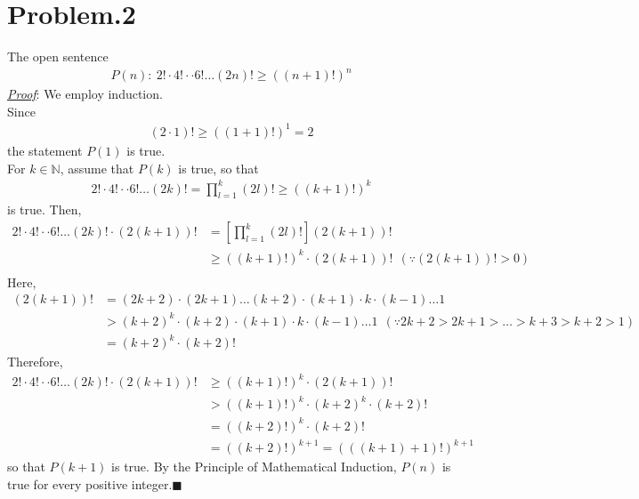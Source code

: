 \documentclass[12pt]{article}
\begin{document}
\section*{Problem.2}
The open sentence
\begin{gather*}
P(n):~ 2! \cdot 4! \cdot \cdot 6! \dots (2n)! \geq ((n+1)!)^n
\end{gather*}
\underline{\textit{Proof}}: We employ induction.\\[1em]
Since
\begin{gather*}
(2\cdot1)! \geq ((1+1)!)^1 = 2
\end{gather*}
the statement $P(1)$ is true.\\
For $k \in \mathbb{N}$, assume that $P(k)$ is true, so that
\begin{gather*}
2! \cdot 4! \cdot \cdot 6! \dots (2k)! = \prod_{l=1}^{k} (2l)! \geq ((k+1)!)^k
\end{gather*}
is true. Then,
\begin{align*}
2! \cdot 4! \cdot \cdot 6! \dots (2k)! \cdot (2(k+1))! &= \left[\prod_{l=1}^{k} (2l)! \right] (2(k+1))!\\[1em]
&\geq ((k+1)!)^k \cdot (2(k+1))! ~~\left(\because (2(k+1))! > 0\right)\\[1em]
\end{align*}
Here,
\begin{align*}
(2(k+1))! &= (2k+2) \cdot (2k+1) \dots (k+2) \cdot (k+1) \cdot k \cdot (k-1) \dots 1\\[1em]
& > (k + 2)^{k} \cdot (k + 2) \cdot (k+1) \cdot k \cdot (k-1) \dots 1 ~~\left(\because 2k + 2 > 2k + 1 > \dots > k + 3 > k + 2 > 1\right)\\[1em]
&= (k + 2)^{k} \cdot (k+2)!
\end{align*}
Therefore,
\begin{align*}
2! \cdot 4! \cdot \cdot 6! \dots (2k)! \cdot (2(k+1))! &\geq ((k+1)!)^k \cdot (2(k+1))! \\[1em]
&> ((k+1)!)^k \cdot (k + 2)^{k} \cdot (k+2)!\\[1em]
&= ((k+2)!)^{k} \cdot (k+2)!\\[1em]
&= ((k+2)!)^{k+1} = (((k+1)+1)!)^{k+1}
\end{align*}
so that $P(k+1)$ is true. By the Principle of Mathematical Induction, $P(n)$ is true for every positive integer.$\blacksquare$
\end{document}
